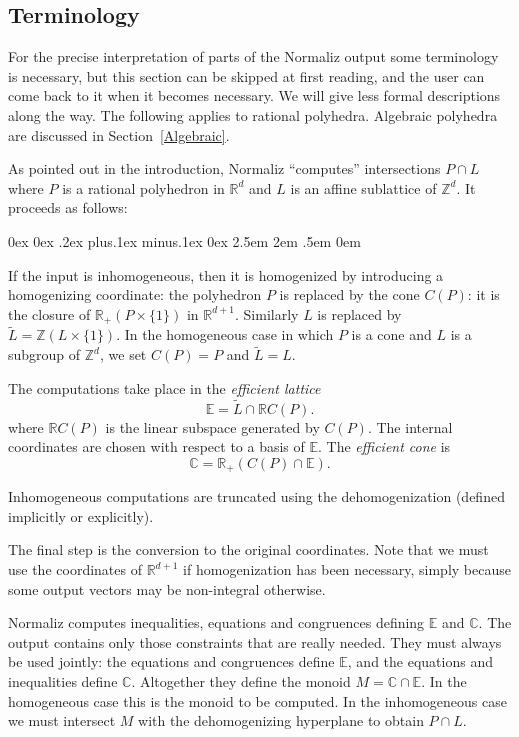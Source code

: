 \documentclass[12pt,a4paper]{scrartcl}
\newcounter{listi}
\newcommand{\stdli}{ \topsep0ex \partopsep0ex %
\parsep.2ex plus.1ex minus.1ex \itemsep0ex%
\leftmargin2.5em \labelwidth2em \labelsep.5em \rightmargin0em}%
\newenvironment{arab}{\begin{list}{\textup{(\arabic{listi})}}%
	{\usecounter{listi}\stdli}}{\end{list}}
\theoremstyle{definition}
\def\CC{{\mathbb C}}
\def\ZZ{{\mathbb Z}}
\def\RR{{\mathbb R}}
\def\EE{{\mathbb E}}
\begin{document}
\subsection{Terminology}\label{Term}

For the precise interpretation of parts of the Normaliz output some terminology is necessary, but this section can be skipped at first reading, and the user can come back to it when it becomes necessary. We will give less formal descriptions along the way. The following applies to rational polyhedra. Algebraic polyhedra are discussed in Section~\ref{Algebraic}.

As pointed out in the introduction, Normaliz ``computes'' intersections $P\cap L$ where $P$ is a rational polyhedron in $\RR^d$ and $L$ is an affine sublattice of $\ZZ^d$. It proceeds as follows:

\begin{arab}
	\item If the input is inhomogeneous, then it is homogenized by introducing a homogenizing coordinate: the polyhedron $P$ is replaced by the cone $C(P)$: it is the closure of $\RR_+(P\times \{1\})$ in $\RR^{d+1}$. Similarly $L$ is replaced by $\widetilde L=\ZZ(L\times \{1\})$. In the homogeneous case in which $P$ is a cone and $L$ is a subgroup of $\ZZ^d$, we set $C(P)=P$ and $\widetilde L=L$.
	
	\item The computations take place in the \emph{efficient lattice}
	$$
	\EE=\widetilde{L}\cap \RR C(P).
	$$
	where $\RR C(P)$ is the linear subspace generated by $C(P)$. The internal coordinates are chosen with respect to a basis of $\EE$. The \emph{efficient cone} is
	$$
	\CC=\RR_+(C(P)\cap \EE).
	$$
	
	\item Inhomogeneous computations are truncated using the dehomogenization (defined implicitly or explicitly).
	
	\item The final step is the conversion to the original coordinates. Note that we must use the coordinates of $\RR^{d+1}$ if homogenization has been necessary, simply because some output vectors may be non-integral otherwise.
\end{arab}

Normaliz computes inequalities, equations and congruences defining $\EE$ and $\CC$. The output contains only those constraints that are really needed. They must always be used jointly: the equations and congruences define $\EE$, and the equations and inequalities define $\CC$. Altogether they define the monoid $M=\CC\cap\EE$. In the homogeneous case this is the monoid to be computed. In the inhomogeneous case we must intersect $M$ with the dehomogenizing hyperplane to obtain $P\cap L$.
\end{document}
